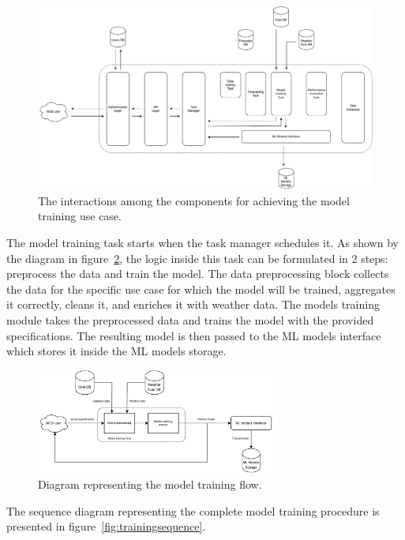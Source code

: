 \begin{figure}[H]
\centering
\includegraphics[width=1\textwidth]{images/architecture_training_interactions}
\caption{The interactions among the components for achieving the model training use case.}
\label{fig:traininginteractions}
\end{figure}

The model training task starts when the task manager schedules it.
As shown by the diagram in figure~\ref{fig:trainingflow}, the logic inside this task can be formulated in 2 steps: preprocess the data and train the model.
The data preprocessing block collects the data for the specific use case for which the model will be trained, aggregates it correctly, cleans it, and enriches it with weather data.
The models training module takes the preprocessed data and trains the model with the provided specifications.
The resulting model is then passed to the ML models interface which stores it inside the ML models storage.

\begin{figure}[H]
\centering
\includegraphics[width=0.7\textwidth]{images/architecture_training_flow}
\caption{Diagram representing the model training flow.}
\label{fig:trainingflow}
\end{figure}

The sequence diagram representing the complete model training procedure is presented in figure~\ref{fig:trainingsequence}.

